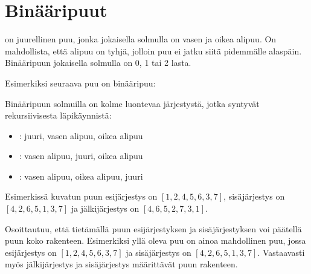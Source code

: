 \section{Binääripuut}


\begin{samepage}
 on juurellinen puu,
jonka jokaisella solmulla on vasen ja oikea alipuu.
On mahdollista, että alipuu on tyhjä,
jolloin puu ei jatku siitä pidemmälle alaspäin.
Binääripuun jokaisella solmulla on 0, 1 tai 2 lasta.

Esimerkiksi seuraava puu on binääripuu:

\begin{center}
\end{center}
\end{samepage}

Binääripuun solmuilla on kolme luontevaa järjestystä,
jotka syntyvät rekursiivisesta läpikäynnistä:


\begin{itemize}
\item {}: juuri, vasen alipuu, oikea alipuu
\item {}: vasen alipuu, juuri, oikea alipuu
\item {}: vasen alipuu, oikea alipuu, juuri
\end{itemize}

Esimerkissä kuvatun puun esijärjestys on
$[1,2,4,5,6,3,7]$,
sisäjärjestys on $[4,2,6,5,1,3,7]$
ja jälkijärjestys on $[4,6,5,2,7,3,1]$.

Osoittautuu, että tietämällä puun esijärjestyksen
ja sisäjärjestyksen voi päätellä puun koko rakenteen.
Esimerkiksi yllä oleva puu on ainoa mahdollinen
puu, jossa esijärjestys on
$[1,2,4,5,6,3,7]$ ja sisäjärjestys on $[4,2,6,5,1,3,7]$.
Vastaavasti myös jälkijärjestys ja sisäjärjestys
määrittävät puun rakenteen.

